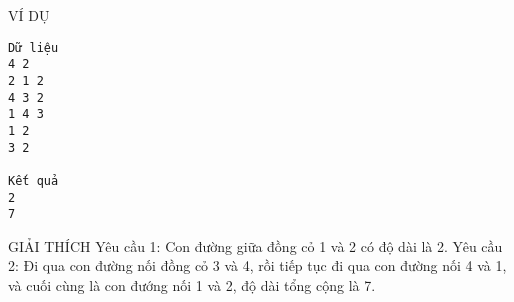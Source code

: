 VÍ DỤ  
\begin{verbatim}
Dữ liệu
4 2
2 1 2
4 3 2
1 4 3
1 2
3 2

Kết quả
2
7
\end{verbatim}
   GIẢI THÍCH  
Yêu cầu 1: Con đường giữa đồng cỏ 1 và 2 có độ dài là 2. Yêu cầu 2: Đi qua con đường nối đồng cỏ 3 và 4, rồi tiếp tục đi qua con đường nối 4 và 1, và cuối cùng là con đướng nối 1 và 2, độ dài tổng cộng là 7.